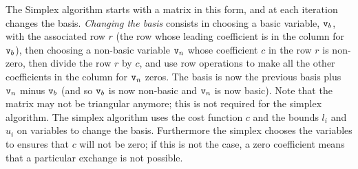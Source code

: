 \documentclass[sttt]{svjour}
\begin{document}
The Simplex algorithm starts with a matrix in this form, and at each iteration changes the basis. \emph{Changing the basis} consists in choosing a basic variable, $\mathtt{v}_b$, with the associated row $r$ (the row whose leading coefficient is in the column for $\mathtt{v}_b$), then choosing a non-basic variable $\mathtt{v}_n$ whose coefficient $c$ in the row $r$ is non-zero, then divide the row $r$ by $c$, and use row operations to make all the other coefficients in the column for $\mathtt{v}_n$ zeros. 
The basis is now the previous basis plus $\mathtt{v}_n$ minus $\mathtt{v}_b$ (and so $\mathtt{v}_b$ is now non-basic and $\mathtt{v}_n$ is now basic).
Note that the matrix may not be triangular anymore; this is not required for the simplex algorithm.
The simplex algorithm uses the cost function $c$ and the bounds $l_i$ and $u_i$ on variables to change the basis.
Furthermore the simplex chooses the variables to ensures that $c$ will not be zero; if this is not the case, a zero coefficient means that a particular exchange is not possible.
\end{document}
